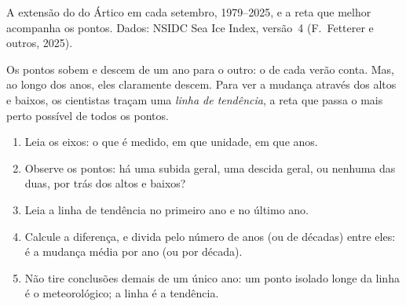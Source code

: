 \begin{omfigure}

{\small A extensão do  do Ártico em cada setembro, 1979--2025,
e a reta que melhor acompanha os pontos. Dados: NSIDC Sea Ice Index,
versão~4 (F.~Fetterer e outros, 2025).}
\label{fig:g8:ice-on-earth:sea-ice}
\end{omfigure}

Os pontos sobem e descem de um ano para o outro: o  de cada verão
conta. Mas, ao longo dos anos, eles claramente descem. Para ver a mudança
através dos altos e baixos, os cientistas traçam uma \emph{linha de
tendência}, a reta que passa o mais perto possível de todos os pontos.

\begin{method}
\begin{enumerate}
  \item Leia os eixos: o que é medido, em que unidade, em que anos.
  \item Observe os pontos: há uma subida geral, uma descida geral, ou
        nenhuma das duas, por trás dos altos e baixos?
  \item Leia a linha de tendência no primeiro ano e no último ano.
  \item Calcule a diferença, e divida pelo número de anos (ou de décadas)
        entre eles: é a mudança média por ano (ou por década).
  \item Não tire conclusões demais de um único ano: um ponto isolado
        longe da linha é o  meteorológico; a linha é a tendência.
\end{enumerate}
\end{method}


